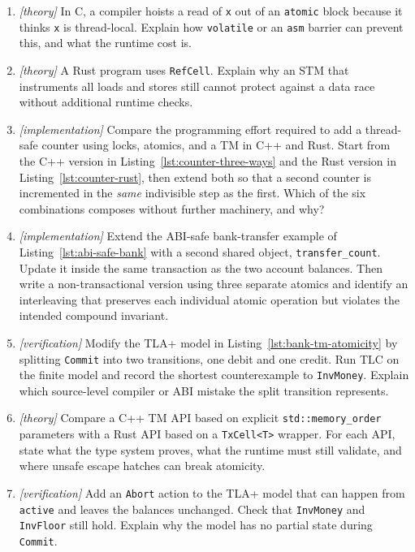 \begin{enumerate}
\item \emph{[theory]} In C, a compiler hoists a read of \texttt{x} out of
an \texttt{atomic} block because it thinks \texttt{x} is thread-local.
Explain how \texttt{volatile} or an \texttt{asm} barrier can prevent
this, and what the runtime cost is.

\item \emph{[theory]} A Rust program uses \texttt{RefCell}. Explain why an
STM that instruments all loads and stores still cannot protect against
a data race without additional runtime checks.

\item \emph{[implementation]} Compare the programming effort required to
add a thread-safe counter using locks, atomics, and a TM in C++ and
Rust. Start from the C++ version in Listing~\ref{lst:counter-three-ways}
and the Rust version in Listing~\ref{lst:counter-rust}, then extend
both so that a second counter is incremented in the \emph{same}
indivisible step as the first. Which of the six combinations composes
without further machinery, and why?

\item \emph{[implementation]} Extend the ABI-safe bank-transfer example of
Listing~\ref{lst:abi-safe-bank} with a second shared object,
\texttt{transfer\_count}. Update it inside the same transaction as the
two account balances. Then write a non-transactional version using
three separate atomics and identify an interleaving that preserves each
individual atomic operation but violates the intended compound
invariant.

\item \emph{[verification]} Modify the TLA+ model in
Listing~\ref{lst:bank-tm-atomicity} by splitting \texttt{Commit} into
two transitions, one debit and one credit. Run TLC on the finite model
and record the shortest counterexample to \texttt{InvMoney}. Explain
which source-level compiler or ABI mistake the split transition
represents.

\item \emph{[theory]} Compare a C++ TM API based on explicit
\texttt{std::memory\_order} parameters with a Rust API based on a
\texttt{TxCell<T>} wrapper. For each API, state what the type system
proves, what the runtime must still validate, and where unsafe escape
hatches can break atomicity.

\item \emph{[verification]} Add an \texttt{Abort} action to the TLA+ model
that can happen from \texttt{active} and leaves the balances unchanged.
Check that \texttt{InvMoney} and \texttt{InvFloor} still hold. Explain
why the model has no partial state during \texttt{Commit}.


\end{enumerate}
